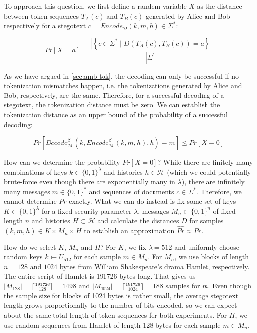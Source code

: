 To approach this question, we first define a random variable $X$ as the distance between token sequences $T_A(c)$ and $T_B(c)$ generated by Alice and Bob respectively for a stegotext $c = Encode_{\mathcal{D}}(k,m,h) \in \Sigma^*$:

$$Pr[X=a] = \frac{\left| \left\{ c \in \Sigma^* \mid D(T_A(c), T_B(c)) = a \right\} \right|}{\left| \Sigma^* \right|}$$

As we have argued in \autoref{sec:amb-tok}, the decoding can only be successful if no tokenization mismatches happen, i.e. the tokenizations generated by Alice and Bob, respectively, are the same.
Therefore, for a successful decoding of a stegotext, the tokenization distance must be zero.
We can establish the tokenization distance as an upper bound of the probability of a successful decoding:

$$Pr[Decode_{\mathcal{M}}^\beta(k, Encode_{\mathcal{M}}^\beta(k,m,h), h)=m] \leq Pr[X=0]$$

How can we determine the probability $Pr[X=0]$?
While there are finitely many combinations of keys $k \in \{0,1\}^\lambda$ and histories $h \in \mathcal{H}$ (which we could potentially brute-force even though there are exponentially many in $\lambda$), there are infinitely many messages $m \in \{0,1\}^*$ and sequences of documents $c \in \Sigma^*$.
Therefore, we cannot determine $Pr$ exactly.
What we can do instead is fix some set of keys $K \subset \{0,1\}^\lambda$ for a fixed security parameter $\lambda$, messages $M_n \subset \{0,1\}^n$ of fixed length $n$ and histories $H \subset \mathcal{H}$ and calculate the distances $D$ for samples $(k,m,h) \in K \times M_n \times H$ to establish an approximation $\hat{Pr} \approx Pr$.

How do we select $K$, $M_n$ and $H$?
For $K$, we fix $\lambda = 512$ and uniformly choose random keys $k \leftarrow U_{512}$ for each sample $m \in M_n$.
For $M_n$, we use blocks of length $n=128$ and $1024$ bytes from William Shakespeare's drama Hamlet, respectively.
The entire script of Hamlet is 191726 bytes long.
That gives us $|M_{128}|=\lceil \frac{191726}{128} \rceil = 1498$ and $|M_{1024}|= \lceil \frac{191726}{1024} \rceil = 188$ samples for $m$.
Even though the sample size for blocks of 1024 bytes is rather small, the average stegotext length grows proportionally to the number of bits encoded, so we can expect about the same total length of token sequences for both experiments.
For $H$, we use random sequences from Hamlet of length 128 bytes for each sample $m \in M_n$.

